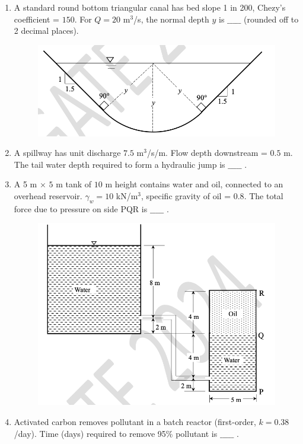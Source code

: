 \documentclass[journal]{IEEEtran}
\begin{document}
\begin{enumerate}
\hfill {}  

\item A standard round bottom triangular canal has bed slope 1 in 200,  Chezy's coefficient = $150$. For $Q=20$ m$^3$/s, the normal depth $y$  is $\_\_\_\_\_$ (rounded off to 2 decimal places).  
\hfill {}  

\begin{figure}[H]
    \centering
    \includegraphics[width=0.6\columnwidth]{figs/Q57.png} 
    \caption{}
    \label{fig:placeholder}
\end{figure}

\item A spillway has unit discharge $7.5$ m$^3$/s/m. Flow depth downstream = $0.5$ m. The tail water depth  required to form a hydraulic jump is $\_\_\_\_\_$ .  
\hfill {}  

\item A 5 m $\times$ $5$ m tank of $10$ m height contains water and oil, connected to an overhead reservoir. $\gamma_w = 10$ kN/m$^3$, specific gravity of oil = $0.8$. The total force  due to pressure on side PQR is $\_\_\_\_\_$ .  
\hfill {}  
\begin{figure}[H]
    \centering
    \includegraphics[width=0.6\columnwidth]{figs/Q59.png} 
    \caption{}
    \label{fig:placeholder}
\end{figure}


\item Activated carbon removes pollutant in a batch reactor (first-order, $k=0.38$/day). Time (days) required to remove 95\% pollutant is $\_\_\_\_\_$ .  
\hfill {}  


\end{enumerate}
\end{document}
